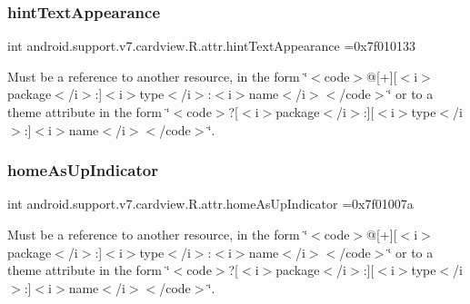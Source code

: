 \subsubsection{\texorpdfstring{hint\+Text\+Appearance}{hintTextAppearance}}
{\footnotesize\ttfamily int android.\+support.\+v7.\+cardview.\+R.\+attr.\+hint\+Text\+Appearance =0x7f010133\hspace{0.3cm}{\ttfamily [static]}}

Must be a reference to another resource, in the form \char`\"{}$<$code$>$@\mbox{[}+\mbox{]}\mbox{[}$<$i$>$package$<$/i$>$\+:\mbox{]}$<$i$>$type$<$/i$>$\+:$<$i$>$name$<$/i$>$$<$/code$>$\char`\"{} or to a theme attribute in the form \char`\"{}$<$code$>$?\mbox{[}$<$i$>$package$<$/i$>$\+:\mbox{]}\mbox{[}$<$i$>$type$<$/i$>$\+:\mbox{]}$<$i$>$name$<$/i$>$$<$/code$>$\char`\"{}. \mbox{\label{classandroid_1_1support_1_1v7_1_1cardview_1_1R_1_1attr_a3d5f180614304935612a39e384a7c14a}} 
\subsubsection{\texorpdfstring{home\+As\+Up\+Indicator}{homeAsUpIndicator}}
{\footnotesize\ttfamily int android.\+support.\+v7.\+cardview.\+R.\+attr.\+home\+As\+Up\+Indicator =0x7f01007a\hspace{0.3cm}{\ttfamily [static]}}

Must be a reference to another resource, in the form \char`\"{}$<$code$>$@\mbox{[}+\mbox{]}\mbox{[}$<$i$>$package$<$/i$>$\+:\mbox{]}$<$i$>$type$<$/i$>$\+:$<$i$>$name$<$/i$>$$<$/code$>$\char`\"{} or to a theme attribute in the form \char`\"{}$<$code$>$?\mbox{[}$<$i$>$package$<$/i$>$\+:\mbox{]}\mbox{[}$<$i$>$type$<$/i$>$\+:\mbox{]}$<$i$>$name$<$/i$>$$<$/code$>$\char`\"{}. \mbox{\label{classandroid_1_1support_1_1v7_1_1cardview_1_1R_1_1attr_a0576ee185b32fbfd1a3a5cb94886e8d3}} 
